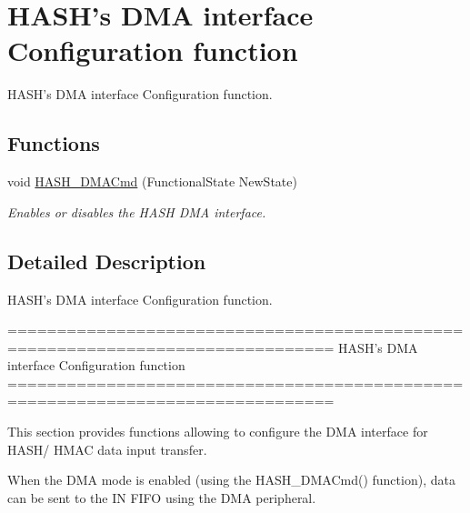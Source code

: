\hypertarget{group___h_a_s_h___group4}{\section{H\-A\-S\-H's D\-M\-A interface Configuration function}
\label{group___h_a_s_h___group4}
}


H\-A\-S\-H's D\-M\-A interface Configuration function.  


\subsection*{Functions}
\begin{DoxyCompactItemize}
\item 
void \hyperlink{group___h_a_s_h___group4_ga6bc756803b0b3a03eecc47cb570e1bd3}{H\-A\-S\-H\-\_\-\-D\-M\-A\-Cmd} (Functional\-State New\-State)
\begin{DoxyCompactList}\small\item\em Enables or disables the H\-A\-S\-H D\-M\-A interface. \end{DoxyCompactList}\end{DoxyCompactItemize}


\subsection{Detailed Description}
H\-A\-S\-H's D\-M\-A interface Configuration function. \begin{DoxyVerb} ===============================================================================
                   HASH's DMA interface Configuration function
 ===============================================================================  

  This section provides functions allowing to configure the DMA interface for 
  HASH/ HMAC data input transfer.
   
  When the DMA mode is enabled (using the HASH_DMACmd() function), data can be 
  sent to the IN FIFO using the DMA peripheral.\end{DoxyVerb}
 


